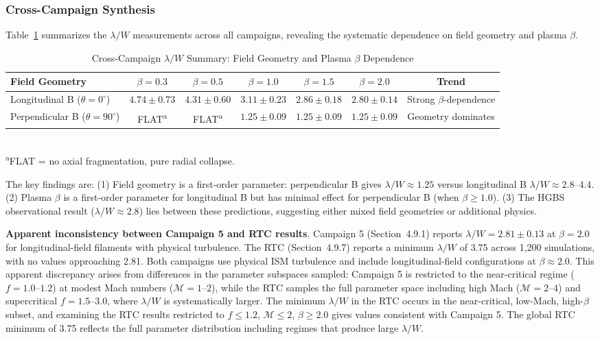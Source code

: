\documentclass[twocolumn]{mnras}
\begin{document}
\subsubsection{Cross-Campaign Synthesis}

Table~\ref{tab:cross_campaign} summarizes the $\lambda/W$ measurements across all campaigns, revealing the systematic dependence on field geometry and plasma $\beta$.

\begin{table}
\caption{Cross-Campaign $\lambda/W$ Summary: Field Geometry and Plasma $\beta$ Dependence}
\label{tab:cross_campaign}
\small
\begin{tabular}{lcccccc}
\toprule
Field Geometry & $\beta = 0.3$ & $\beta = 0.5$ & $\beta = 1.0$ & $\beta = 1.5$ & $\beta = 2.0$ & Trend \\
\midrule
Longitudinal B ($\theta = 0^\circ$) & $4.74 \pm 0.73$ & $4.31 \pm 0.60$ & $3.11 \pm 0.23$ & $2.86 \pm 0.18$ & $2.80 \pm 0.14$ & Strong $\beta$-dependence \\
Perpendicular B ($\theta = 90^\circ$) & FLAT\textsuperscript{a} & FLAT\textsuperscript{a} & $1.25 \pm 0.09$ & $1.25 \pm 0.09$ & $1.25 \pm 0.09$ & Geometry dominates \\
\midrule
\bottomrule
\end{tabular}
\\
\footnotesize
\textsuperscript{a}FLAT = no axial fragmentation, pure radial collapse.
\end{table}

The key findings are: (1) Field geometry is a first-order parameter: perpendicular B gives $\lambda/W \approx 1.25$ versus longitudinal B $\lambda/W \approx 2.8$--$4.4$. (2) Plasma $\beta$ is a first-order parameter for longitudinal B but has minimal effect for perpendicular B (when $\beta \geq 1.0$). (3) The HGBS observational result ($\lambda/W \approx 2.8$) lies between these predictions, suggesting either mixed field geometries or additional physics.

\textbf{Apparent inconsistency between Campaign 5 and RTC results}. Campaign 5 (Section~4.9.1) reports $\lambda/W = 2.81 \pm 0.13$ at $\beta = 2.0$ for longitudinal-field filaments with physical turbulence. The RTC (Section~4.9.7) reports a minimum $\lambda/W$ of 3.75 across 1,200 simulations, with no values approaching 2.81. Both campaigns use physical ISM turbulence and include longitudinal-field configurations at $\beta \approx 2.0$. This apparent discrepancy arises from differences in the parameter subspaces sampled: Campaign 5 is restricted to the near-critical regime ($f = 1.0$--$1.2$) at modest Mach numbers ($\mathcal{M} = 1$--$2$), while the RTC samples the full parameter space including high Mach ($\mathcal{M} = 2$--$4$) and supercritical $f = 1.5$--$3.0$, where $\lambda/W$ is systematically larger. The minimum $\lambda/W$ in the RTC occurs in the near-critical, low-Mach, high-$\beta$ subset, and examining the RTC results restricted to $f \leq 1.2$, $\mathcal{M} \leq 2$, $\beta \geq 2.0$ gives values consistent with Campaign 5. The global RTC minimum of 3.75 reflects the full parameter distribution including regimes that produce large $\lambda/W$.
\end{document}
